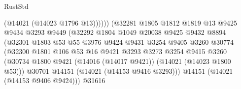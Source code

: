 \begin{lexlean}{RustStd}
\begin{coremodule}
                                              (@14021 (@14023 @1796 @13))))))
                                      (@32281
                                        @1805
                                        @1812
                                        @1819
                                        @13
                                        @9425
                                        @9434
                                        @3293
                                        @9449
                                        (@32292
                                          @1804
                                          @1049
                                          @20038
                                          @9425
                                          @9432
                                          @8894
                                          (@32301
                                            @1803
                                            @53
                                            @55
                                            @3976
                                            @9424
                                            @9431
                                            @3254
                                            @9405
                                            @3260
                                            @30774
                                            (@32300
                                              @1801
                                              @106
                                              @53
                                              @16
                                              @9421
                                              @3293
                                              @3273
                                              @3254
                                              @9415
                                              @3260
                                              (@30734
                                                @1800
                                                @9421
                                                (@14016 (@14017 @9421))
                                                (@14021 (@14023 @1800 @53)))
                                              @30701
                                              @14151
                                              (@14021 (@14153 @9416 @3293)))
                                            @14151
                                            (@14021 (@14153 @9406 @9424)))
                                          @31616

\end{coremodule}
\end{lexlean}
